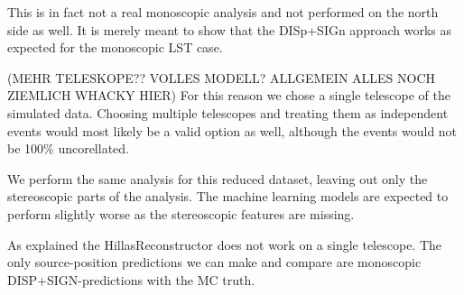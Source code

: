 This is in fact not a real monoscopic analysis and not performed on the north 
side as well. It is merely meant to show that the DISp+SIGn approach works as
expected for the monoscopic LST case.

(MEHR TELESKOPE?? VOLLES MODELL? ALLGEMEIN ALLES NOCH ZIEMLICH WHACKY HIER)
For this reason we chose a single telescope of the simulated data.
Choosing multiple telescopes and treating them as independent events 
would most likely be a valid option as well, although the 
events would not be 100\% uncorellated.

We perform the same analysis for this reduced dataset, leaving out only 
the stereoscopic parts of the analysis.
The machine learning models are expected 
to perform slightly worse as the stereoscopic features are missing.

As explained the HillasReconstructor does not work on a single telescope.
The only source-position predictions we can make and compare are monoscopic 
DISP+SIGN-predictions with the MC truth.
\fi